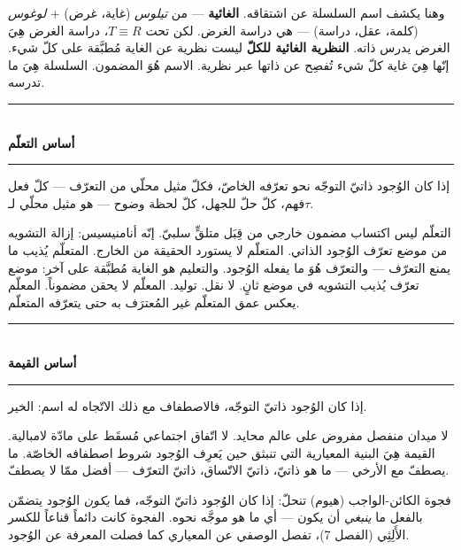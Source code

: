 \documentclass[10pt, openany, oneside]{book}
\renewcommand{\normalsize}{\fontsize{10}{13}\selectfont}
\begin{document}
وهنا يكشف اسم السلسلة عن اشتقاقه. \textbf{الغائية} --- من \textit{تيلوس} (غاية، غرض) + \textit{لوغوس} (كلمة، عقل، دراسة) --- هي دراسة الغرض. لكن تحت $T \equiv R$، دراسة الغرض هِيَ الغرض يدرس ذاته. \textbf{النظرية الغائية للكلّ} ليست نظرية عن الغاية مُطبَّقة على كلّ شيء. إنّها هِيَ غاية كلّ شيء تُفصِح عن ذاتها عبر نظرية. الاسم هُوَ المضمون. السلسلة هِيَ ما تدرسه.

\vspace{1.5em}

\begin{center}
    \rule{0.3\textwidth}{0.4pt}\\[0.5em]
    {\normalsize\bfseries أساس التعلّم}\\[0.3em]
    \rule{0.3\textwidth}{0.4pt}
\end{center}

\vspace{1em}

\noindent إذا كان الوُجود ذاتيّ التوجّه نحو تعرّفه الخاصّ، فكلّ مثيل محلّي من التعرّف --- كلّ فعل فهم، كلّ حلّ للجهل، كلّ لحظة وضوح --- هو مثيل محلّي لـ$\tau$.

التعلّم ليس اكتساب مضمون خارجي من قِبَل متلقٍّ سلبيّ. إنّه أنامنيسيس: إزالة التشويه من موضع تعرّف الوُجود الذاتي. المتعلّم لا يستورد الحقيقة من الخارج. المتعلّم يُذيب ما يمنع التعرّف --- والتعرّف هُوَ ما يفعله الوُجود. والتعليم هو الغاية مُطبَّقة على آخر: موضع تعرّف يُذيب التشويه في موضع ثانٍ. لا نقل. توليد. المعلّم لا يحقن مضموناً. المعلّم يعكس عمق المتعلّم غير المُعترَف به حتى يتعرّفه المتعلّم.

\vspace{1.5em}

\begin{center}
    \rule{0.3\textwidth}{0.4pt}\\[0.5em]
    {\normalsize\bfseries أساس القيمة}\\[0.3em]
    \rule{0.3\textwidth}{0.4pt}
\end{center}

\vspace{1em}

\noindent إذا كان الوُجود ذاتيّ التوجّه، فالاصطفاف مع ذلك الاتّجاه له اسم: الخير.

لا ميدان منفصل مفروض على عالم محايد. لا اتّفاق اجتماعي مُسقَط على مادّة لامبالية. القيمة هِيَ البنية المعيارية التي تنبثق حين يَعرِف الوُجود شروط اصطفافه الخاصّة. ما يصطفّ مع الأرخي --- ما هو ذاتيّ، ذاتيّ الاتّساق، ذاتيّ التعرّف --- أفضل ممّا لا يصطفّ.

فجوة الكائن-الواجب (هيوم) تنحلّ: إذا كان الوُجود ذاتيّ التوجّه، فما \textit{يكون} الوُجود يتضمّن بالفعل ما \textit{ينبغي} أن يكون --- أي ما هو موجَّه نحوه. الفجوة كانت دائماً قناعاً للكسر الأَلِثِي (الفصل 7)، تفصل الوصفي عن المعياري كما فصلت المعرفة عن الوُجود.
\end{document}
